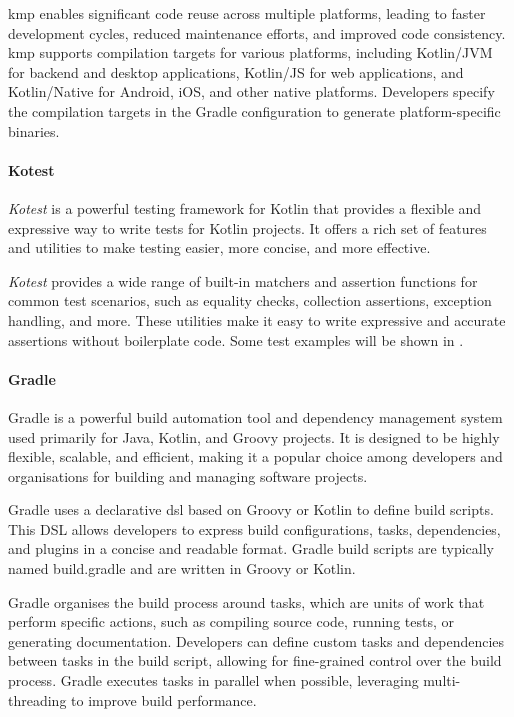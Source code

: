 \ac{kmp} enables significant code reuse across multiple platforms, leading to faster development cycles,
reduced maintenance efforts, and improved code consistency.
\ac{kmp} supports compilation targets for various platforms, including Kotlin/JVM for backend and desktop applications,
Kotlin/JS for web applications, and Kotlin/Native for Android, iOS, and other native platforms.
Developers specify the compilation targets in the Gradle configuration to generate platform-specific binaries.

\paragraph{Kotest}
\emph{Kotest} is a powerful testing framework for Kotlin that provides a flexible and expressive way to write tests for Kotlin projects.
It offers a rich set of features and utilities to make testing easier, more concise, and more effective.

\emph{Kotest} provides a wide range of built-in matchers and assertion functions for common test scenarios, such as equality
checks, collection assertions, exception handling, and more.
These utilities make it easy to write expressive and accurate assertions without boilerplate code.
Some test examples will be shown in .

\paragraph{Gradle}
Gradle is a powerful build automation tool and dependency management system used primarily for Java, Kotlin, and Groovy projects.
It is designed to be highly flexible, scalable, and efficient, making it a popular choice among developers and
organisations for building and managing software projects.

Gradle uses a declarative \ac{dsl} based on Groovy or Kotlin to define build scripts.
This DSL allows developers to express build configurations, tasks, dependencies, and plugins in a concise and readable format.
Gradle build scripts are typically named build.gradle and are written in Groovy or Kotlin.

Gradle organises the build process around tasks, which are units of work that perform specific actions, such as compiling
source code, running tests, or generating documentation.
Developers can define custom tasks and dependencies between tasks in the build script, allowing for fine-grained control over the build process.
Gradle executes tasks in parallel when possible, leveraging multi-threading to improve build performance.


